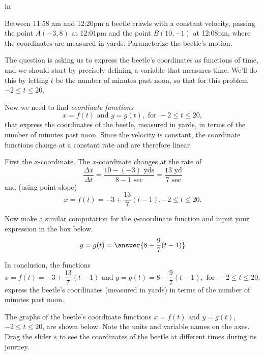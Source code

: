 \documentclass{ximera}
\newcommand{\pskip}{\vskip 0.1 in}
\begin{document}
\pskip

\begin{example}   \label{Ex1}
 Between 11:58 am and 12:20pm a beetle crawls with a constant velocity, passing the point $A(-3,8)$ at 12:01pm and the point $B(10,-1)$ at 12:08pm, where the coordinates are measured in yards. Parameterize the beetle's motion.
\end{example}

\begin{explanation}
The question is asking us to express the beetle's coordinates as functions of time, and we should start by precisely defining a variable that measures time. We'll do this by letting $t$ be the number of minutes past noon, so that for this problem $-2 \leq t \leq 20$. 

Now we need to find \emph{coordinate functions}
\[
   x = f(t) \text{ and } y = g(t) , \text{ for } -2\leq t \leq 20 ,
\]
that express the coordinates of the beetle, measured in yards, in terms of the number of minutes past noon.  Since the velocity is constant, the coordinate functions change at a constant rate and are therefore linear.

First the $x$-coordinate. The $x$-coordinate changes at the rate of 
\[
    \frac{\Delta x}{\Delta t} = \frac{10-(-3) \text{ yds}}{8-1 \text{ sec}} = \frac{13 \text{ yd}}{7 \text{ sec}}
\]
and (using point-slope) 
\[
     x = f(t) = -3 + \frac{13}{7}(t-1) , -2\leq t \leq 20 .
\]


\begin{question} 
Now make a similar computation for the $y$-coordinate function and input your expression in the box below. 
\[
 y=g(t) =  \answer{8-\frac{9}{7}(t-1)} 
\]
    \end{question}

In conclusion, the functions
\[
    x = f(t) = -3 + \frac{13}{7}(t-1) \text{ and }  y=g(t) = 8-\frac{9}{7}(t-1) , \text{ for } -2\leq t \leq 20 ,
\]
express the beetle's coordinates (measured in yards) in terms of the number of minutes past noon.

\end{explanation}

\begin{exploration}\label{exp:pc1}
The graphs of the beetle's coordinate functions $x=f(t)$ and $y=g(t)$, $-2\leq t \leq 20$, are shown below. Note the units and variable names on the axes. Drag the slider $s$ to see the coordinates of the beetle at different times during its journey.
 
 
\begin{onlineOnly}
    \begin{center}
\end{center}
\end{onlineOnly}
\end{exploration}
\end{document}
